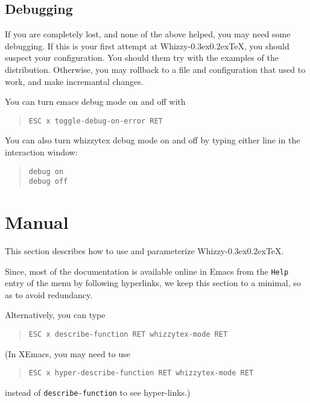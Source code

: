 \documentclass[12pt]{article}
\makeatletter
\let \lst \verb
\def \whizzy {{Whizzy\kern -0.3ex\raise 0.2ex\hbox{\let \@\relax\TeX}}}
\makeatother
\begin{document}
\subsection {Debugging}

If you are completely lost, and none of the above helped, you may need some
debugging.  If this is your first attempt at {\whizzy}, you should suspect your
configuration. You should them try with the examples of the distribution. 
Otherwise, you may rollback to a file and configuration that used to work, 
and make incremantal changes.

You can turn emacs debug mode on and off with
\begin{quote}
\begin{verbatim}
ESC x toggle-debug-on-error RET
\end{verbatim}
\end{quote}
You can also turn whizzytex debug mode on and off by typing either line
in the interaction window:
\begin{quote}
\begin{verbatim}
debug on
debug off
\end{verbatim}
\end{quote}






\section {\label{manual}Manual} 

This section describes how to use and parameterize {\whizzy}. 

Since, most of the documentation is available online in Emacs from the
\lst"Help" entry of the menu by following hyperlinks, we keep this section
to a minimal, so as to avoid redundancy. 

Alternatively, you can type
\begin{quote}
\begin{verbatim}
ESC x describe-function RET whizzytex-mode RET
\end{verbatim}
\end{quote}
(In XEmacs, you may need to use
\begin{quote}
\begin{verbatim}
ESC x hyper-describe-function RET whizzytex-mode RET
\end{verbatim}
\end{quote}
instead of \lst"describe-function" to see hyper-links.)
\end{document}
